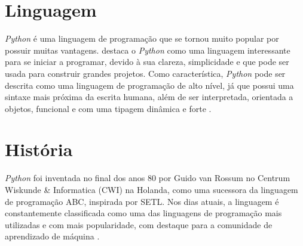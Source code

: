 \section{Linguagem}
\indent \textit{Python} é uma linguagem de programação que se tornou muito popular por possuir muitas vantagens. \cite{menezes2010introduccao} destaca o \textit{Python} como uma linguagem interessante para se iniciar a programar, devido à sua clareza, simplicidade e que pode ser usada para construir grandes projetos. Como característica, \textit{Python} pode ser descrita como uma linguagem de programação de alto nível, já que possui uma sintaxe mais próxima da escrita humana, além de ser interpretada, orientada a objetos, funcional e com uma tipagem dinâmica e forte \cite{wiki:python}.

\section{História}
\indent \textit{Python} foi inventada no final dos anos 80 por Guido van Rossum no Centrum Wiskunde \& Informatica (CWI) na Holanda, como uma sucessora da linguagem de programação ABC, inspirada por SETL. Nos dias atuais, a linguagem é constantemente classificada como uma das linguagens de programação mais utilizadas e com mais popularidade, com destaque para a comunidade de aprendizado de máquina \cite{wiki:python}.
%